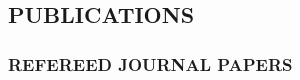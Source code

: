 \documentclass[10pt,a4]{article}
\begin{document}
\begin{small}
%
%
%
%
%

\thispagestyle{fancy}
\fancyhf{}
\rfoot{\textcolor{gray}{Page \thepage}}
\fancyfoot[C]{}


\subsection*{PUBLICATIONS}
\vspace{0.2cm}

\subsubsection*{REFEREED JOURNAL PAPERS}


\end{small}
\end{document}
